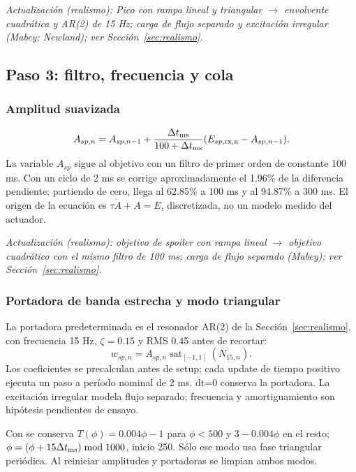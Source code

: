 \documentclass[11pt,a4paper]{article}
\newcommand{\code}[1]{\texttt{\detokenize{#1}}}
\newcommand{\sat}{\operatorname{sat}}
\begin{document}
\textit{Actualización (realismo): Pico con rampa lineal y triangular $\rightarrow$ envolvente cuadrática y AR(2) de 15 Hz; carga de flujo separado y excitación irregular (Mabey; Newland); ver Sección~\ref{sec:realismo}.}

\subsection{Paso 3: filtro, frecuencia y cola}
\subsubsection{Amplitud suavizada}
\begin{equation}
A_{sp,n}=A_{sp,n-1}+\frac{\Delta t_{\rm ms}}{100+\Delta t_{\rm ms}}
(E_{sp,\rm rx,n}-A_{sp,n-1}).
\end{equation}
La variable $A_{sp}$ sigue al objetivo con un filtro de primer orden de constante 100 ms. Con un ciclo de 2 ms se corrige aproximadamente el 1.96\% de la diferencia pendiente; partiendo de cero, llega al 62.85\% a 100 ms y al 94.87\% a 300 ms. El origen de la ecuación es $\tau\dot A+A=E$, discretizada, no un modelo medido del actuador.


\textit{Actualización (realismo): objetivo de spoiler con rampa lineal $\rightarrow$ objetivo cuadrático con el mismo filtro de 100 ms; carga de flujo separado (Mabey); ver Sección~\ref{sec:realismo}.}

\subsubsection{Portadora de banda estrecha y modo triangular}
La portadora predeterminada es el resonador AR(2) de la Sección~\ref{sec:realismo}, con frecuencia 15 Hz, $\zeta=0.15$ y RMS 0.45 antes de recortar:
\begin{equation}w_{sp,n}=A_{sp,n}\sat_{[-1,1]}(N_{15,n}).\end{equation}
Los coeficientes se precalculan antes de setup; cada update de tiempo positivo ejecuta un paso a período nominal de 2 ms. dt=0 conserva la portadora. La excitación irregular modela flujo separado; frecuencia y amortiguamiento son hipótesis pendientes de ensayo.

Con \code{SIMCONNECT_BUFFET_NARROWBAND=0} se conserva $T(\phi)=0.004\phi-1$ para $\phi<500$ y $3-0.004\phi$ en el resto; $\phi=(\phi+15\Delta t_{\rm ms})\bmod1000$, inicio 250. Sólo ese modo usa fase triangular periódica. Al reiniciar amplitudes y portadoras se limpian ambos modos.
\end{document}
